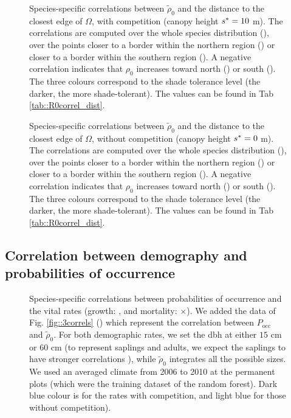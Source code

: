 \begin{refsection}
\begin{figure}
	\centering
	
	\caption{Species-specific correlations between $ \tilde \rho_0 $ and the distance to the closest edge of $ \Omega $, with competition (canopy height $ {s}^{*} = 10 $ m). The correlations are computed over the whole species distribution (\CircSteel), over the points closer to a border within the northern region (\MoveUp) or closer to a border within the southern region (\MoveDown). A negative correlation indicates that $ \rho_0 $ increases toward north (\MoveUp) or south (\MoveDown). The three colours correspond to the shade tolerance level (the darker, the more shade-tolerant). The values can be found in Tab \ref{tab::R0correl_dist}. \label{fig::3correls_dist}}
\end{figure}

\begin{figure}
	\centering
	
	\caption{Species-specific correlations between $ \tilde \rho_0 $ and the distance to the closest edge of $ \Omega $, without competition (canopy height $ {s}^{*} = 0 $ m). The correlations are computed over the whole species distribution (\CircSteel), over the points closer to a border within the northern region (\MoveUp) or closer to a border within the southern region (\MoveDown). A negative correlation indicates that $ \rho_0 $ increases toward north (\MoveUp) or south (\MoveDown). The three colours correspond to the shade tolerance level (the darker, the more shade-tolerant). The values can be found in Tab \ref{tab::R0correl_dist}. \label{fig::3correls_dist_0}}
\end{figure}

\subsection{Correlation between demography and probabilities of occurrence}
\begin{figure}
	\centering
	
	\caption{Species-specific correlations between probabilities of occurrence and the vital rates (growth: \CircSteel, and mortality: $ \times $). We added the data of Fig. \ref{fig::3correls} (\MoveUp) which represent the correlation between $ P_{\text{occ}} $ and $ \tilde \rho_0 $. For both demographic rates, we set the dbh at either $ 15 $ cm or $ 60 $ cm (to represent saplings and adults, we expect the saplings to have stronger correlations \citep{Kunstler2019}), while $ \tilde \rho_0 $ integrates all the possible sizes. We used an averaged climate from 2006 to 2010 at the permanent plots (which were the training dataset of the random forest). Dark blue colour is for the rates with competition, and light blue for those without competition). \label{fig::demog_Pocc1-4}}
\end{figure}


\end{refsection}
